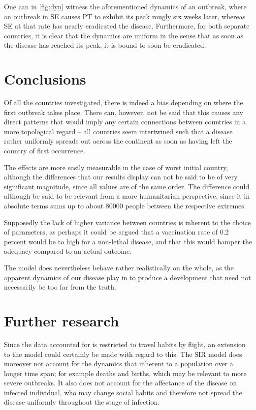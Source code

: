 \documentclass[a4paper,12pt]{article}
\theoremstyle{plain}
\theoremstyle{definition}
\begin{document}
   One can in \cref{fig:dyn} witness the aforementioned dynamics of an outbreak,
   where an outbreak in SE causes PT to exhibit its peak rougly six weeks
   later, whereas SE at that rate has nearly eradicated the disease.
   Furthermore, for both separate countries, it is clear that the dynamics are
   uniform in the sense that as soon as the disease has reached its peak, it is
   bound to soon be eradicated.  

\section*{Conclusions}
   Of all the countries investigated, there is indeed a bias depending on where
   the first outbreak takes place. There can, however, not be said that this
   causes any direct patterns that would imply any certain connections between
   countries in a more topological regard -- all countries seem intertwined
   such that a disease rather uniformly spreads out across the continent as soon
   as having left the country of first occurrence. 

   The effects are more easily measurable in the case of worst initial country, 
   although the differences that our
   results display can not be said to be of very significant magnitude, since
   all values are of the same order. The difference could although be said to be
   relevant from a more humanitarian perspective, since it in absolute terms sums 
   up to about 80000 people between the respective extremes.
   
   Supposedly the lack of higher variance between countries  is inherent to the 
   choice of parameters, as perhaps it could be
   argued that a vaccination rate of 0.2 percent would be to high for a
   non-lethal disease, and that this would hamper the adequacy compared to an
   actual outcome. 

   The model does nevertheless behave rather realistically on the whole, as the
   apparent dynamics of our disease play in to produce a development that need not
   necessarily be too far from the truth. 

\newpage
\section*{Further research}
  Since the data accounted for is restricted to travel habits by flight, an
  extension to the model could certainly be made with regard to this. The SIR
  model does moreover not account for the dynamics that inherent to a population
  over a longer time span; for example deaths and births, which may be relevant
  to more severe outbreaks. It also does not account for the
  affectance of the disease on infected individual, who may change social habits
  and therefore not spread the disease uniformly throughout the stage of infection.
\end{document}
